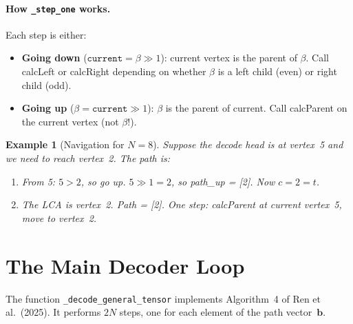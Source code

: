 \documentclass[11pt,a4paper]{article}
\newtheorem{example}{Example}[section]
\begin{document}
\paragraph{How \texttt{\_step\_one} works.}
Each step is either:
\begin{itemize}
    \item \textbf{Going down} ($\texttt{current} = \beta \gg 1$): current vertex is the parent of $\beta$. Call calcLeft or calcRight depending on whether $\beta$ is a left child (even) or right child (odd).
    \item \textbf{Going up} ($\beta = \texttt{current} \gg 1$): $\beta$ is the parent of current. Call calcParent on the current vertex (not $\beta$!).
\end{itemize}

\begin{example}[Navigation for $N = 8$]
Suppose the decode head is at vertex~5 and we need to reach vertex~2. The path is:
\begin{enumerate}
    \item From 5: $5 > 2$, so go up. $5 \gg 1 = 2$, so path\_up = [2]. Now $c = 2 = t$.
    \item The LCA is vertex~2. Path = [2]. One step: calcParent at current vertex~5, move to vertex~2.
\end{enumerate}
\end{example}


\section{The Main Decoder Loop}
\label{sec:decoder_loop}

The function \texttt{\_decode\_general\_tensor} implements Algorithm~4 of Ren et al.\ (2025). It performs $2N$ steps, one for each element of the path vector~$\mathbf{b}$.
\end{document}
